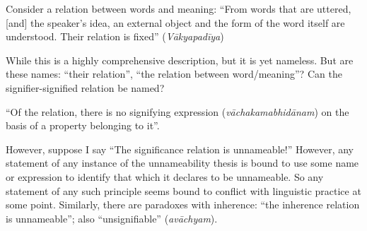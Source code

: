 \begin{myquote}
Consider a relation between words and meaning: “From words that are uttered, [and] the speaker's idea, an external object and the form of the word itself are understood. Their relation is fixed” (\textsl{Vākyapadīya}) 

While this is a highly comprehensive description, but it is yet nameless. But are these names: “their relation”, “the relation between word/meaning”? Can the signifier-signified relation be named? 

“Of the relation, there is no signifying expression (\textsl{vāchakamabhidānam}) on the basis of a property belonging to it”. 

However, suppose I say “The significance relation is unnameable!” However, any statement of any instance of the unnameability thesis is bound to use some name or expression to identify that which it declares to be unnameable. So any statement of any such principle seems bound to conflict with linguistic practice at some point. Similarly, there are paradoxes with inherence: “the inherence relation is unnameable”; also “unsignifiable” (\textsl{avāchyam}).
\end{myquote}

